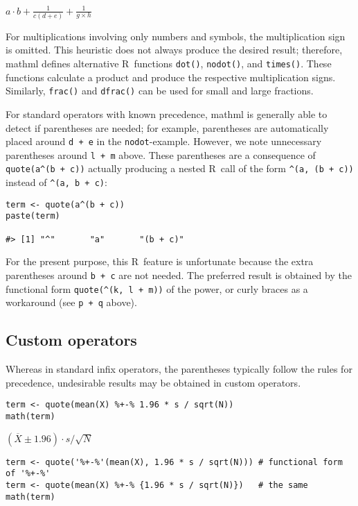 \({{{a}{\cdot}{b}}{+}{\frac{1}{{c}{{}}{\left({d}{+}{e}\right)}}}}{+}{\displaystyle{\frac{1}{{g}{\times}{h}}}}\)

For multiplications involving only numbers and symbols, the
multiplication sign is omitted. This heuristic does not always produce
the desired result; therefore, mathml defines alternative R~functions
\texttt{dot()}, \texttt{nodot()}, and \texttt{times()}. These functions calculate a product
and produce the respective multiplication signs. Similarly, \texttt{frac()} and
\texttt{dfrac()} can be used for small and large fractions.

For standard operators with known precedence, mathml is generally able
to detect if parentheses are needed; for example, parentheses are
automatically placed around \texttt{d~+~e} in the \texttt{nodot}-example. However, we
note unnecessary parentheses around \texttt{l~+~m} above. These parentheses are
a consequence of \texttt{quote(a\^{}(b~+~c))} actually producing a nested R~call
of the form \texttt{\^{}(a,~(b~+~c))} instead of \texttt{\^{}(a,~b~+~c)}:

\begin{verbatim}
term <- quote(a^(b + c))
paste(term)

#> [1] "^"       "a"       "(b + c)"
\end{verbatim}

For the present purpose, this R~feature is unfortunate because the extra
parentheses around \texttt{b~+~c} are not needed. The preferred result is
obtained by the functional form \texttt{quote(\^{}(k,~l~+~m))} of the power, or
curly braces as a workaround (see \texttt{p~+~q} above).

\hypertarget{custom-operators}{%
\subsection{Custom operators}\label{custom-operators}}

Whereas in standard infix operators, the parentheses typically follow
the rules for precedence, undesirable results may be obtained in custom
operators.

\begin{verbatim}
term <- quote(mean(X) %+-% 1.96 * s / sqrt(N))
math(term)
\end{verbatim}

\({{\left({\overline{X}}{\pm}{1.96}\right)}{\cdot}{s}}{/}{\sqrt{N}}\)

\begin{verbatim}
term <- quote('%+-%'(mean(X), 1.96 * s / sqrt(N))) # functional form of '%+-%'
term <- quote(mean(X) %+-% {1.96 * s / sqrt(N)})   # the same
math(term)
\end{verbatim}

